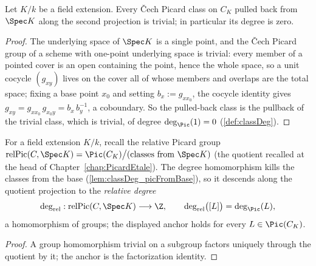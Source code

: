 \begin{lemma}
  \label{lem:classDeg_picFromBase}
  \leanok
  Let \(K/k\) be a field extension. Every \v Cech Picard class on \(C_K\) pulled back
  from \(\Spec K\) along the second projection is trivial; in particular its degree is
  zero.
\end{lemma}
\begin{proof}
  \leanok
  The underlying space of \(\Spec K\) is a single point, and the \v Cech Picard group
  of a scheme with one-point underlying space is trivial: every member of a pointed
  cover is an open containing the point, hence the whole space, so a unit cocycle
  \((g_{xy})\) lives on the cover all of whose members and overlaps are the total
  space; fixing a base point \(x_0\) and setting \(b_x := g_{x x_0}\), the cocycle
  identity gives \(g_{xy} = g_{x x_0}\, g_{x_0 y} = b_x\, b_y^{-1}\), a coboundary. So
  the pulled-back class is the pullback of the trivial class, which is trivial, of
  degree \(\deg_{\Pic}(1) = 0\) (\ref{def:classDeg}).
\end{proof}

\begin{definition}
  \label{def:relPicDeg}
  \leanok
  For a field extension \(K/k\), recall the relative Picard group
  \(\mathrm{relPic}(C, \Spec K) = \Pic(C_K) \big/ (\text{classes from } \Spec K)\)
  (the quotient recalled at the head of Chapter~\ref{chap:PicardEtale}). The degree
  homomorphism kills the classes from the base
  (\ref{lem:classDeg_picFromBase}), so it descends along the quotient projection to
  the \emph{relative degree}
  \[
    \deg_{\mathrm{rel}} : \mathrm{relPic}(C, \Spec K) \longrightarrow \Z,
    \qquad \deg_{\mathrm{rel}}\bigl([L]\bigr) = \deg_{\Pic}(L),
  \]
  a homomorphism of groups; the displayed anchor holds for every
  \(L \in \Pic(C_K)\).
\end{definition}
\begin{proof}
  \leanok
  A group homomorphism trivial on a subgroup factors uniquely through the quotient by
  it; the anchor is the factorization identity.
\end{proof}

